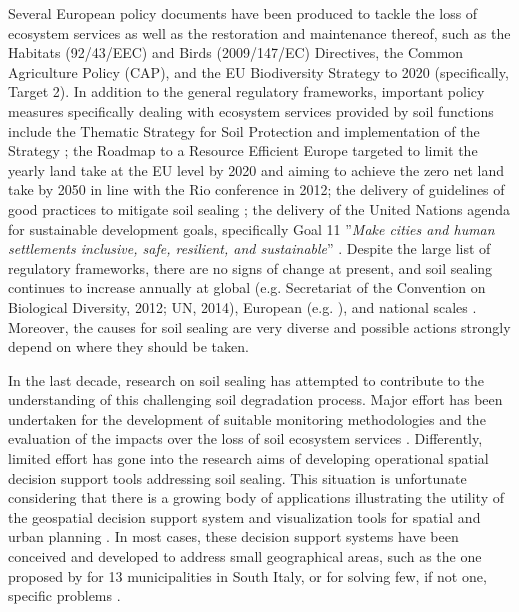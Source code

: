 \documentclass[APA,LATO1COL,doublespace]{WileyNJD-v2}
\begin{document}
Several European policy documents have been produced to tackle the loss of ecosystem services as well as the restoration and maintenance thereof, such as the Habitats (92/43/EEC) and Birds (2009/147/EC) Directives, the Common Agriculture Policy (CAP), and the EU Biodiversity Strategy to 2020 (specifically, Target 2).
In addition to the general regulatory frameworks, important policy measures specifically dealing with ecosystem services provided by soil functions include the Thematic Strategy for Soil Protection \citep{EC2006} and implementation of the Strategy \citep{EC2012}; the Roadmap to a Resource Efficient Europe \citep{EC2011a} targeted to limit the yearly land take at the EU level by 2020 and aiming to achieve the zero net land take by 2050 in line with the Rio conference in 2012; the delivery of guidelines of good practices to mitigate soil sealing \citep{SWD12}; the delivery of the United Nations agenda \citep{UN15} for sustainable development goals, specifically Goal 11 ''\textit{Make cities and human settlements inclusive, safe, resilient, and sustainable}'' \citep{Keesstra16}.
Despite the large list of regulatory frameworks, there are no signs of change at present, and soil sealing continues to increase annually \citep{FAO15} at global (e.g. Secretariat of the Convention on Biological Diversity, 2012; UN, 2014), European (e.g. \citealp{SWD12}), and national scales \citep[e.g.][Copernicus Land Monitoring Service\footnote{ http://land.copernicus.eu}]{ISPRA16,ISPRA18}.
Moreover, the causes for soil sealing are very diverse and possible actions strongly depend on where they should be taken.

In the last decade, research on soil sealing has attempted to contribute to the understanding of this challenging soil degradation process. Major effort has been undertaken for the development of suitable monitoring methodologies \citep{ISPRA18,Alvarado18} and the evaluation of the impacts over the loss of soil ecosystem services \citep{Calzolari16}. Differently, limited effort has gone into the research aims of developing operational spatial decision support tools addressing soil sealing.
This situation is unfortunate considering that there is a growing body of applications illustrating the utility of the geospatial decision support system and visualization tools for spatial and urban planning  \citep[e.g.][]{Bishop98,Geertman12,Carsjens07,Malczewski04,Malczewski06,Meyer08}.
In most cases, these decision support systems have been conceived and developed to address small geographical areas, such as the one proposed by \cite{Piero17} for 13 municipalities in South Italy, or for solving few, if not one, specific problems \citep[e.g.][]{Fedra98,Meyer08,Torresan16}. %
\end{document}
